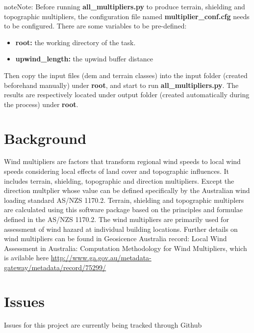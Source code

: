 \documentclass[letterpaper,10pt,english]{sphinxmanual}
\begin{document}
\begin{notice}{note}{Note:}
Before running \textbf{all\_multipliers.py} to produce terrain, shielding and topographic multipliers, the configuration file named \textbf{multiplier\_conf.cfg} needs to be configured. There are some variables to be pre-defined:
\begin{itemize}
\item {} 
\textbf{root:} the working directory of the task.

\item {} 
\textbf{upwind\_length:} the upwind buffer distance

\end{itemize}

Then copy the input files (dem and terrain classes) into the input folder (created beforehand manually) under \textbf{root}, and start to run \textbf{all\_multipliers.py}. The results are respectively located under output folder (created automatically during the process) under \textbf{root}.
\end{notice}


\chapter{Background}
\label{index:background}
Wind multipliers are factors that transform regional wind speeds to local wind speeds considering local effects of land cover and topographic influences.
It includes terrain, shielding, topographic and direction multipliers. Except the direction multplier whose value can be defined specifically by the
Australian wind loading standard AS/NZS 1170.2. Terrain, shielding and topographic multiplers are calculated using this software package based on the
principles and formulae defined in the AS/NZS 1170.2. The wind multipliers are primarily used for assessment of wind hazard at individual building locations.
Further details on wind multipliers can be found in Geosicence Australia record: Local Wind Assessment in Australia: Computation Methodology for Wind Multipliers,
which is avilable here \href{http://www.ga.gov.au/metadata-gateway/metadata/record/75299/}{http://www.ga.gov.au/metadata-gateway/metadata/record/75299/}


\chapter{Issues}
\label{index:issues}
Issues for this project are currently being tracked through Github
\end{document}

